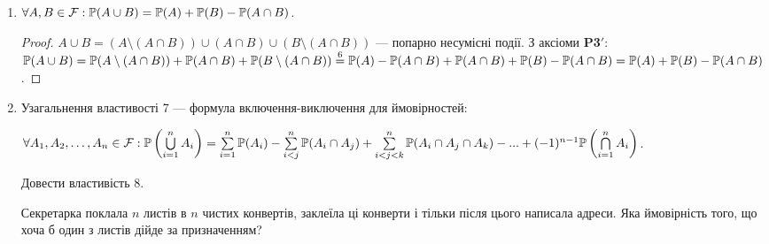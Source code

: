 \begin{enumerate}
    \item $\forall A, B \in \mathcal{F}: \P(A \cup B) = \P(A) + \P(B) - \P(A \cap B)$.
    \begin{proof}
        $A \cup B = (A\setminus(A \cap B)) 
        \cup (A \cap B) 
        \cup (B\setminus(A \cap B))$ --- попарно несумісні події. 
        \newline
        З аксіоми \textbf{P3$'$}: $\P(A \cup B) = \P(A\setminus(A \cap B)) 
        + \P(A \cap B) + \P(B\setminus(A \cap B)) \overset{6}{=} \P(A) - \P(A \cap B) + \P(A \cap B)
        + \P(B) - \P(A \cap B) = \P(A) + \P(B) - \P(A \cap B)$.
    \end{proof}
    \item Узагальнення властивості 7 --- формула включення-виключення для ймовірностей: 
    
    \begin{math}
        \forall A_1, A_2, \dots, A_n \in \mathcal{F} 
    : \P\left(\bigcup\limits_{i=1}^n A_i\right) = \sum\limits_{i=1}^n \P(A_i) - \sum\limits_{i < j}^n \P(A_i \cap A_j)
    + \sum\limits_{i < j < k}^n \P(A_i \cap A_j \cap A_k) - ... + (-1)^{n-1}\P\left(\bigcap\limits_{i=1}^n A_i\right)
    \end{math}.
    \nopagebreak
    \begin{exercise}
        Довести властивість 8.
    \end{exercise}

\begin{example}
    Секретарка поклала $n$ листів в $n$ чистих конвертів, заклеїла ці конверти і тільки 
    після цього написала адреси. Яка ймовірність того, що хоча б один з листів дійде 
    за призначенням?
    

\end{example}
\end{enumerate}
